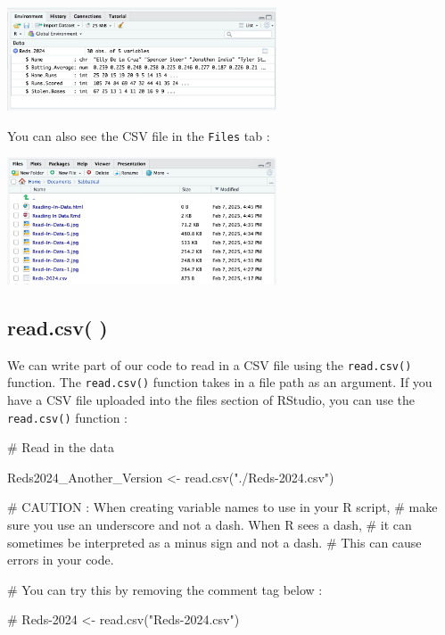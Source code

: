 \documentclass[
  letterpaper,
  DIV=11,
  numbers=noendperiod]{scrreprt}
\newenvironment{Shaded}{\begin{snugshade}}{\end{snugshade}}
\newcommand{\AlertTok}[1]{\textcolor[rgb]{0.68,0.00,0.00}{#1}}
\newcommand{\CommentTok}[1]{\textcolor[rgb]{0.37,0.37,0.37}{#1}}
\newcommand{\FunctionTok}[1]{\textcolor[rgb]{0.28,0.35,0.67}{#1}}
\newcommand{\NormalTok}[1]{\textcolor[rgb]{0.00,0.23,0.31}{#1}}
\newcommand{\OtherTok}[1]{\textcolor[rgb]{0.00,0.23,0.31}{#1}}
\newcommand{\StringTok}[1]{\textcolor[rgb]{0.13,0.47,0.30}{#1}}
\begin{document}
\includegraphics[width=0.6\textwidth,height=\textheight]{./images/Read-In-Data-7.jpg}

You can also see the CSV file in the \texttt{Files} tab :

\includegraphics[width=0.6\textwidth,height=\textheight]{./images/Read-In-Data-8.jpg}

\subsection*{read.csv( )}\label{read.csv}

We can write part of our code to read in a CSV file using the
\texttt{read.csv()} function. The \texttt{read.csv()} function takes in
a file path as an argument. If you have a CSV file uploaded into the
files section of RStudio, you can use the \texttt{read.csv()} function :

\begin{Shaded}
\begin{Highlighting}[]
\CommentTok{\# Read in the data}

\NormalTok{Reds2024\_Another\_Version }\OtherTok{\textless{}{-}} \FunctionTok{read.csv}\NormalTok{(}\StringTok{"./Reds{-}2024.csv"}\NormalTok{)}

\CommentTok{\# }\AlertTok{CAUTION}\CommentTok{ : When creating variable names to use in your R script,}
\CommentTok{\# make sure you use an underscore and not a dash. When R sees a dash, }
\CommentTok{\# it can sometimes be interpreted as a minus sign and not a dash. }
\CommentTok{\# This can cause errors in your code.}

\CommentTok{\# You can try this by removing the comment tag below :}

\CommentTok{\# Reds{-}2024 \textless{}{-} read.csv("Reds{-}2024.csv")}
\end{Highlighting}
\end{Shaded}
\end{document}
